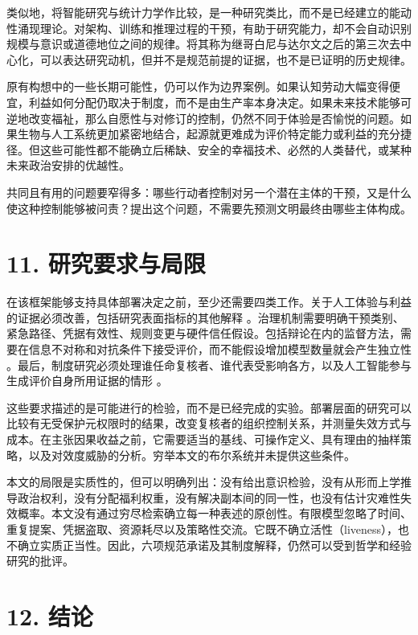 \documentclass[11pt,a4paper,fontset=fandol]{ctexart}
\begin{document}
类似地，将智能研究与统计力学作比较，是一种研究类比，而不是已经建立的能动性涌现理论。对架构、训练和推理过程的干预，有助于研究能力，却不会自动识别规模与意识或道德地位之间的规律。将其称为继哥白尼与达尔文之后的第三次去中心化，可以表达研究动机，但并不是规范前提的证据，也不是已证明的历史规律。

原有构想中的一些长期可能性，仍可以作为边界案例。如果认知劳动大幅变得便宜，利益如何分配仍取决于制度，而不是由生产率本身决定。如果未来技术能够可逆地改变福祉，那么自愿性与对修订的控制，仍然不同于体验是否愉悦的问题。如果生物与人工系统更加紧密地结合，起源就更难成为评价特定能力或利益的充分捷径。但这些可能性都不能确立后稀缺、安全的幸福技术、必然的人类替代，或某种未来政治安排的优越性。

共同且有用的问题要窄得多：哪些行动者控制对另一个潜在主体的干预，又是什么使这种控制能够被问责？提出这个问题，不需要先预测文明最终由哪些主体构成。

\hypertarget{section-12}{%
\section{11. 研究要求与局限}\label{section-12}}

在该框架能够支持具体部署决定之前，至少还需要四类工作。关于人工体验与利益的证据必须改善，包括研究表面指标的其他解释 \cite{ref-2} \cite{ref-3}。治理机制需要明确干预类别、紧急路径、凭据有效性、规则变更与硬件信任假设。包括辩论在内的监督方法，需要在信息不对称和对抗条件下接受评价，而不能假设增加模型数量就会产生独立性 \cite{ref-10}。最后，制度研究必须处理谁任命复核者、谁代表受影响各方，以及人工智能参与生成评价自身所用证据的情形 \cite{ref-21} \cite{ref-22}。

这些要求描述的是可能进行的检验，而不是已经完成的实验。部署层面的研究可以比较有无受保护元权限时的结果，改变复核者的组织控制关系，并测量失效方式与成本。在主张因果收益之前，它需要适当的基线、可操作定义、具有理由的抽样策略，以及对效度威胁的分析。穷举本文的布尔系统并未提供这些条件。

本文的局限是实质性的，但可以明确列出：没有给出意识检验，没有从形而上学推导政治权利，没有分配福利权重，没有解决副本间的同一性，也没有估计灾难性失效概率。本文没有通过穷尽检索确立每一种表述的原创性。有限模型忽略了时间、重复提案、凭据盗取、资源耗尽以及策略性交流。它既不确立活性（liveness），也不确立实质正当性。因此，六项规范承诺及其制度解释，仍然可以受到哲学和经验研究的批评。

\hypertarget{section-13}{%
\section{12. 结论}\label{section-13}}
\end{document}
